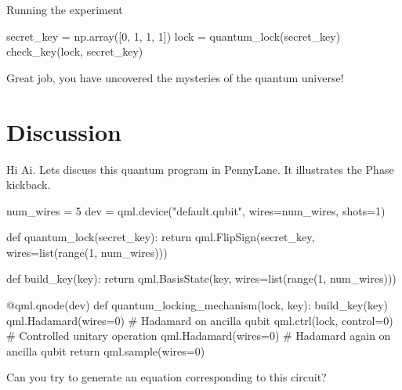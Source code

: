 Running the experiment

\begin{python}
secret_key = np.array([0, 1, 1, 1])
lock = quantum_lock(secret_key)
check_key(lock, secret_key)
\end{python}

\begin{result}
Great job, you have uncovered the mysteries of the quantum universe!
\end{result}


\section{Discussion}

\begin{ai}
Hi Ai. Lets discuss this quantum program in PennyLane. It illustrates the Phase kickback.

\begin{python}
num_wires = 5
dev = qml.device("default.qubit", wires=num_wires, shots=1)

def quantum_lock(secret_key):
  return qml.FlipSign(secret_key, wires=list(range(1, num_wires)))

def build_key(key):
  return qml.BasisState(key, wires=list(range(1, num_wires)))

@qml.qnode(dev)
def quantum_locking_mechanism(lock, key):
  build_key(key)
  qml.Hadamard(wires=0)  # Hadamard on ancilla qubit
  qml.ctrl(lock, control=0)  # Controlled unitary operation
  qml.Hadamard(wires=0)  # Hadamard again on ancilla qubit
  return qml.sample(wires=0)
\end{python}

Can you try to generate an equation corresponding to this circuit?
\end{ai}


